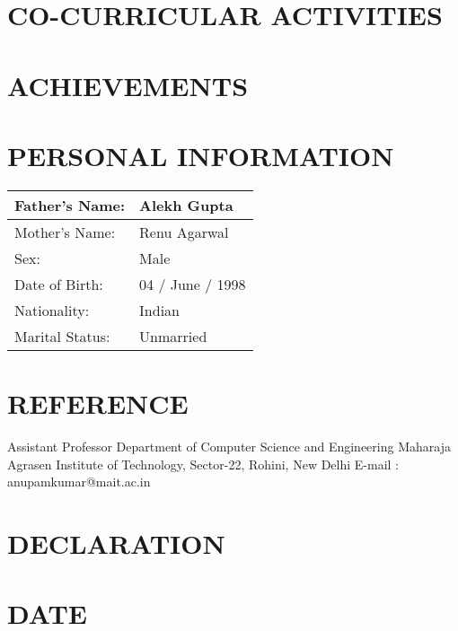 \documentclass[11pt,a4paper,sans]{moderncv}
\begin{document}
\section{CO-CURRICULAR ACTIVITIES}
\newpage{}

\section{ACHIEVEMENTS}

\section{PERSONAL INFORMATION}
\begin{center}
	\begin{tabular}{ | m{5cm} | m{5cm}| }
		\hline
		Father's Name: & Alekh Gupta \\
		\hline
		Mother's Name: & Renu Agarwal\\
		\hline
		Sex: & Male \\
		\hline
		Date of Birth: & 04 / June / 1998 \\
		\hline
		Nationality: & Indian \\
		\hline
		Marital Status: & Unmarried \\
		\hline
	\end{tabular}
\end{center}

\section{REFERENCE}
{Assistant Professor \newline{} Department of Computer Science and Engineering \newline{} Maharaja Agrasen Institute of Technology, Sector-22, Rohini, New Delhi \newline{} E-mail :  anupamkumar@mait.ac.in}

\section{DECLARATION}

\section{DATE}
\end{document}
